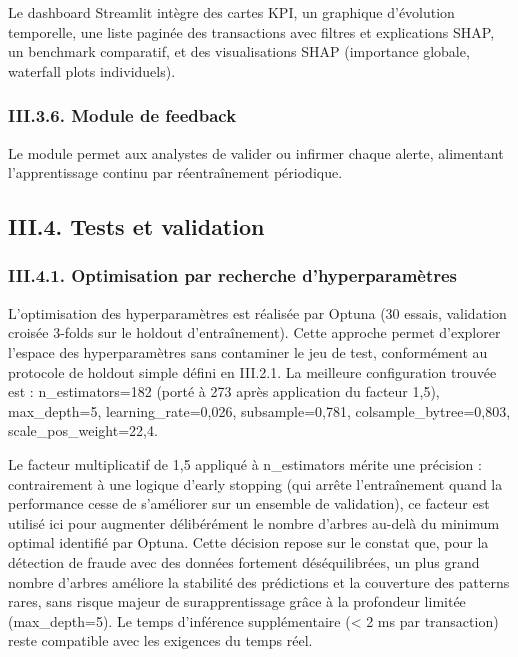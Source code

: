 \documentclass[
  12pt,
]{article}
\begin{document}
Le dashboard Streamlit intègre des cartes KPI, un graphique d’évolution
temporelle, une liste paginée des transactions avec filtres et
explications SHAP, un benchmark comparatif, et des visualisations SHAP
(importance globale, waterfall plots individuels).

\subsubsection{III.3.6. Module de
feedback}\label{iii.3.6.-module-de-feedback}

Le module permet aux analystes de valider ou infirmer chaque alerte,
alimentant l’apprentissage continu par réentraînement périodique.

\subsection{III.4. Tests et
validation}\label{iii.4.-tests-et-validation}

\subsubsection{III.4.1. Optimisation par recherche
d’hyperparamètres}\label{iii.4.1.-optimisation-par-recherche-dhyperparamuxe8tres}

L’optimisation des hyperparamètres est réalisée par Optuna (30 essais,
validation croisée 3-folds sur le holdout d’entraînement). Cette
approche permet d’explorer l’espace des hyperparamètres sans contaminer
le jeu de test, conformément au protocole de holdout simple défini en
III.2.1. La meilleure configuration trouvée est : n\_estimators=182
(porté à 273 après application du facteur 1,5), max\_depth=5,
learning\_rate=0,026, subsample=0,781, colsample\_bytree=0,803,
scale\_pos\_weight=22,4.

Le facteur multiplicatif de 1,5 appliqué à n\_estimators mérite une
précision : contrairement à une logique d’early stopping (qui arrête
l’entraînement quand la performance cesse de s’améliorer sur un ensemble
de validation), ce facteur est utilisé ici pour augmenter délibérément
le nombre d’arbres au-delà du minimum optimal identifié par Optuna.
Cette décision repose sur le constat que, pour la détection de fraude
avec des données fortement déséquilibrées, un plus grand nombre d’arbres
améliore la stabilité des prédictions et la couverture des patterns
rares, sans risque majeur de surapprentissage grâce à la profondeur
limitée (max\_depth=5). Le temps d’inférence supplémentaire (\textless{}
2 ms par transaction) reste compatible avec les exigences du temps réel.
\end{document}
